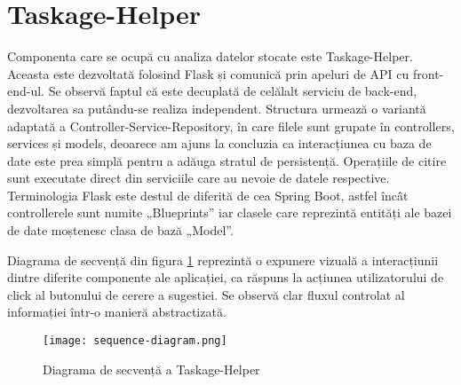 \section{Taskage-Helper}

Componenta care se ocupă cu analiza datelor stocate este Taskage-Helper. Aceasta este dezvoltată folosind Flask și comunică prin apeluri de API cu front-end-ul. Se observă faptul că este decuplată de celălalt serviciu de back-end, dezvoltarea sa putându-se realiza independent. Structura urmează o variantă adaptată a Controller-Service-Repository, în care filele sunt grupate în controllers, services și models, deoarece am ajuns la concluzia ca interacțiunea cu baza de date este prea simplă pentru a adăuga stratul de persistență. Operațiile de citire sunt executate direct din serviciile care au nevoie de datele respective. Terminologia Flask este destul de diferită de cea Spring Boot, astfel încât controllerele sunt numite „Blueprints” iar clasele care reprezintă entități ale bazei de date moștenesc clasa de bază „Model”.

Diagrama de secvență din figura \ref{sequence-diagram} reprezintă o expunere vizuală a interacțiunii dintre diferite componente ale aplicației, ca răspuns la acțiunea utilizatorului de click al butonului de cerere a sugestiei. Se observă clar fluxul controlat al informației într-o manieră abstractizată.

 \begin{figure}[H]
	\centering
 	 \texttt{[image: sequence-diagram.png]}
	\caption{Diagrama de secvență a Taskage-Helper}
	\label{sequence-diagram}
 \end{figure}